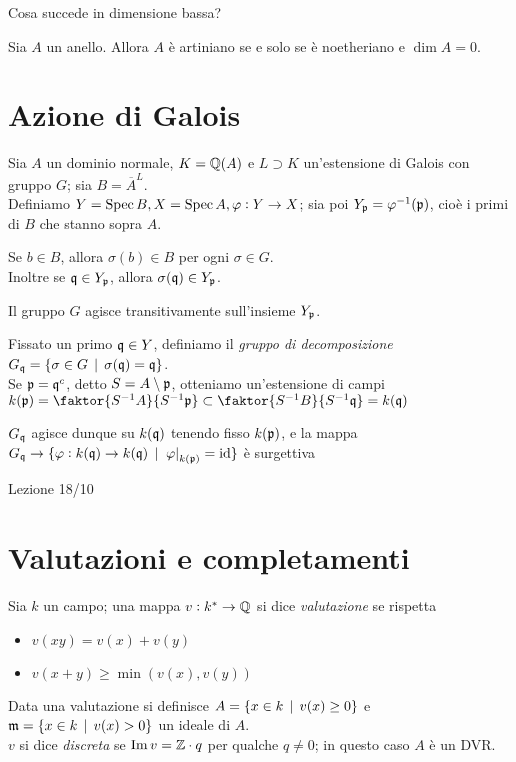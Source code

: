 Cosa succede in dimensione bassa?

\begin{theorem}
    Sia $A$ un anello. Allora $A$ è artiniano se e solo se è noetheriano e $\dim A=0$.
\end{theorem}



\section{Azione di Galois}
Sia $A$ un dominio normale, $K=\mathbb{Q}(A)$ e $L\supset K$ un'estensione di Galois con gruppo $G$; sia $B=\overline{A}^L$.\\
Definiamo $Y=\operatorname{Spec} B, X=\operatorname{Spec} A, \varphi:Y\to X$; sia poi $Y_{\mathfrak{p}}=\varphi^{-1}(\mathfrak{p})$, cioè i primi di $B$ che stanno sopra $A$.

\begin{oss}
    Se $b\in B$, allora $\sigma(b)\in B$ per ogni $\sigma\in G$.\\
    Inoltre se $\mathfrak{q}\in Y_{\mathfrak{p}}$, allora $\sigma(\mathfrak{q})\in Y_{\mathfrak{p}}$.
\end{oss}

\begin{theorem}
    Il gruppo $G$ agisce transitivamente sull'insieme $Y_{\mathfrak{p}}$.
\end{theorem}

\begin{definition}
    Fissato un primo $\mathfrak{q}\in Y$, definiamo il \emph{gruppo di decomposizione} $G_{\mathfrak{q}}=\{ \sigma\in G \operatorname{\; |\;} \sigma(\mathfrak{q})=\mathfrak{q} \}$.\\
    Se $\mathfrak{p}=\mathfrak{q}^c$, detto $S=A\setminus\mathfrak{p}$, otteniamo un'estensione di campi $k(\pf)=\faktor{S^{-1}A}{S^{-1}\pf} \subset \faktor{S^{-1}B}{S^{-1}\qf} =k(\qf)$
\end{definition}

\begin{proposition}
    $G_{\mathfrak{q}}$ agisce dunque su $k(\mathfrak{q})$ tenendo fisso $k(\mathfrak{p})$, e la mappa $G_{\mathfrak{q}}\to\{ \varphi:k(\mathfrak{q})\to k(\mathfrak{q}) \operatorname{\; |\;} \left. \varphi \right|_{k(\mathfrak{p})}=\operatorname{id} \}$ è surgettiva
\end{proposition}

Lezione 18/10

\section{Valutazioni e completamenti}

\begin{definition}
    Sia $k$ un campo; una mappa $v: k^\ast\to\mathbb{Q}$ si dice \emph{valutazione} se rispetta
    \begin{itemize}
        \item $v(xy)=v(x)+v(y)$
        \item $v(x+y)\ge\min(v(x),v(y))$
    \end{itemize}
    Data una valutazione si definisce $A=\{x\in k \operatorname{\; |\;} v(x)\ge0 \}$ e $\mathfrak{m}=\{ x\in k\operatorname{\; |\;} v(x)>0 \}$ un ideale di $A$.\\
    $v$ si dice \emph{discreta} se $\operatorname{Im} v=\mathbb{Z}\cdot q$ per qualche $q\neq0$; in questo caso $A$ è un DVR.
\end{definition}

